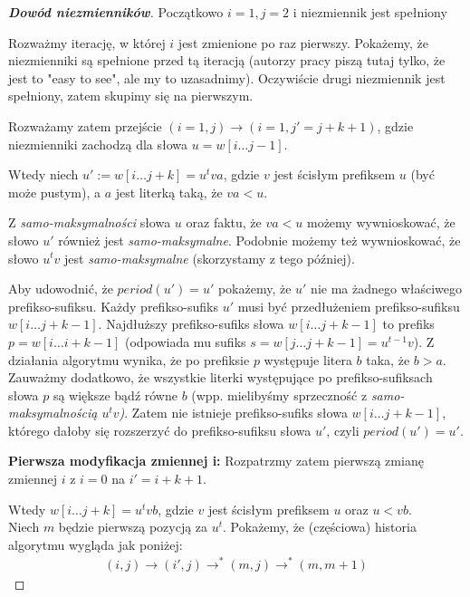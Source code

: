 \documentclass{article}
\begin{document}
\begin{proof}[\textbf{Dowód niezmienników}]
Początkowo $i = 1, j = 2$ i niezmiennik jest spełniony

Rozważmy iterację, w której $i$ jest zmienione po raz pierwszy. Pokażemy, że niezmienniki są spełnione przed tą iteracją 
(autorzy pracy piszą tutaj tylko, że jest to "easy to see", ale my to uzasadnimy). Oczywiście drugi niezmiennik jest spełniony, zatem skupimy się na pierwszym.

Rozważamy zatem przejście $(i=1, j) \rightarrow (i=1, j' = j + k + 1)$, gdzie niezmienniki zachodzą dla słowa $u = w[i \ldots j-1]$.

Wtedy niech $u' := w[i\ldots j + k] = u^tva$, gdzie $v$ jest ścisłym prefiksem $u$ (być może pustym), a $a$ jest literką taką, że $va < u$.

Z \textit{samo-maksymalności} słowa $u$ oraz faktu, że $va < u$ możemy wywnioskować, że słowo $u'$ również jest \textit{samo-maksymalne}.
Podobnie możemy też wywnioskować, że słowo $u^tv$ jest \textit{samo-maksymalne} (skorzystamy z tego później). 

Aby udowodnić, że $period(u') = u'$ pokażemy, że $u'$ nie ma żadnego właściwego prefikso-sufiksu. 
Każdy prefikso-sufiks $u'$ musi być przedłużeniem prefikso-sufiksu $w[i\ldots j+k-1]$. 
Najdłuższy prefikso-sufiks słowa $w[i\ldots j+k-1]$ to prefiks $p = w[i\ldots i+k-1]$ (odpowiada mu sufiks $s = w[j\ldots j+k-1] = u^{t-1}v$).
Z działania algorytmu wynika, że po prefiksie $p$ występuje litera $b$ taka, że $b > a$. 
Zauważmy dodatkowo, że wszystkie literki występujące po prefikso-sufiksach słowa $p$ są większe bądź równe $b$ (wpp. mielibyśmy sprzeczność z \textit{samo-maksymalnością $u^tv$)}.
Zatem nie istnieje prefikso-sufiks słowa $w[i\ldots j+k-1]$, którego dałoby się rozszerzyć do prefikso-sufiksu słowa $u'$, czyli $period(u') = u'$.

\vspace{5pt}

\textbf{Pierwsza modyfikacja zmiennej i:} Rozpatrzmy zatem pierwszą zmianę zmiennej $i$ z $i=0$ na $i' = i + k + 1$. 

Wtedy $w[i\ldots j+k] = u^t vb$, gdzie $v$ jest ścisłym prefiksem $u$ oraz $u < vb$.\\
Niech $m$ będzie pierwszą pozycją za $u^t$. Pokażemy, że (częściowa) historia algorytmu wygląda jak poniżej:
\begin{align*}
    (i, j) \rightarrow (i', j) \rightarrow^{*} (m, j) \rightarrow^{*}(m, m+1)
\end{align*}


\end{proof}
\end{document}
